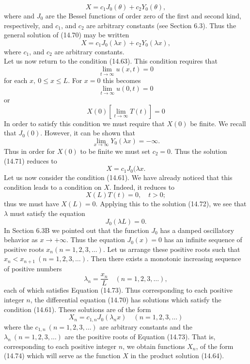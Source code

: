 \documentclass[11pt,a4paper, twoside]{report}
\begin{document}
	$$
	X = c_1J_0(\theta) + c_2Y_0(\theta),
	$$
	where and $J_0$ are the Bessel functions of order zero of the first and second kind,  respectively, and $c_1$, and $c_2$ are arbitrary constants (see Section 6.3). Thus the general solution of (14.70) may be written
	\begin{equation}\tag{14.71}
		X = c_1J_0(\lambda x) + c_2 Y_0(\lambda x),
	\end{equation}
	where $c_1$, and $c_2$ are arbitrary constants.\\
	Let us now return to the condition (14.63). This condition requires that
	$$
	\lim_{t\to \infty} u(x, t) = 0
	$$
	for each $x,\ 0 \leq x \leq L$. For $x = 0$ this becomes
	$$
	\lim_{t\to \infty} u(0, t) = 0
	$$
	or
	$$
	X(0)[\lim_{t\to \infty} T(t)] = 0
	$$
	In order to satisfy this condition we must require that $X(0)$ be finite. We recall that $J_0(0)$. However, it can be shown that
	$$
	\lim_{x\to \infty}Y_0(\lambda x) = -\infty.
	$$
	Thus in order for $X(0)$ to be finite we must set $c_2 = 0$. Thus the solution (14.71) reduces to
	\begin{equation}\tag{14.72}
		X = c_1J_0(\lambda x.
	\end{equation}
	Let us now consider the condition (14.61). We have already noticed that this condition leads to a condition on $X$. Indeed, it reduces to
	$$
	X(L)T(t) = 0,\quad t>0;
	$$
	thus we must have $X(L) = 0$. Applying this to the solution (14.72), we see that $\lambda$ must satisfy the equation
	\begin{equation}\tag{14.73}
		J_0(\lambda L) = 0.
	\end{equation}
	In Section 6.3B we pointed out that the function $J_0$ has a damped oscillatory behavior as $x \to +\infty$. Thus the equation $J_0(x) = 0$ has an infinite sequence of positive roots $x_n(n = 1, 2, 3,\ldots)$. Let us arrange these positive roots such that $x_n < x_{n+1}\ (n=1,2,3,\ldots)$. Then there exists a monotonic increasing sequence of positive numbers
	$$
	\lambda_n = \frac{x_n}{L}\quad (n=1,2,3,\ldots),
	$$
	each of which satisfies Equation (14.73). Thus corresponding to each positive integer $n$, the differential equation (14.70) has solutions which satisfy the condition (14.61). These solutions are of the form
	\begin{equation}\tag{14.74}
		X_n = c_{1,n}J_0(\lambda_nx)\quad (n=1,2,3,\ldots)
	\end{equation}
	where the $c_{1,n}\ (n=1,2,3,\ldots)$ are arbitrary constants and the $\lambda_n\ (n = 1, 2, 3,\ldots)$ are the positive roots of Equation (14.73). That is, corresponding to each positive integer $n$, we obtain functions $X_n$, of the form (14.74) which will serve as the function $X$ in the product solution (14.64).\\
\end{document}
